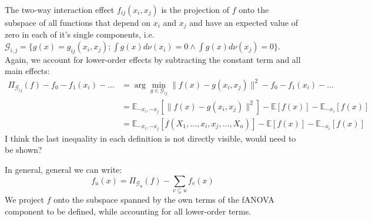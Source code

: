 The two-way interaction effect $f_{ij}(x_i,x_j)$ is the projection of $f$ onto the subspace of all functions that depend on $x_i$ and $x_j$ and have an expected value of zero in each of it's single components, i.e. $\mathcal{G}_{i,j} = \{g(x) = g_{ij}(x_i, x_j); \int g(x) d\nu (x_i) = 0 \land \int g(x) d\nu (x_j) = 0\}$. Again, we account for lower-order effects by subtracting the constant term and all main effects:
\begin{align*}
    \Pi_{\mathcal{G}_{ij}}(f) - f_0 - f_1(x_i) - \dots
    &= \arg \min_{g \in \mathcal{G}_{ij}} \|f(x) - g(x_i, x_j)\|^2 - f_0 - f_1(x_i) - \dots \\
    &= \mathbb{E}_{-x_i, -x_j}[\|f(x) - g(x_i, x_j)\|^2] - \mathbb{E}[f(x)] - \mathbb{E}_{-x_i}[f(x)]\\
    &= \mathbb{E}_{-x_i, -x_j}[f(X_1, \dots, x_i, x_j, \dots, X_n)] - \mathbb{E}[f(x)] - \mathbb{E}_{-x_i}[f(x)]
\end{align*}
{\color{blue}I think the last inequality in each definition is not directly visible, would need to be shown?}

In general, general we can write:
\begin{equation}
    f_u(x) = \Pi_{\mathcal{G}_u}(f) - \sum_{v \subsetneq u} f_v(x)
\end{equation}
We project $f$ onto the subspace spanned by the own terms of the fANOVA component to be defined, while accounting for all lower-order terms.





